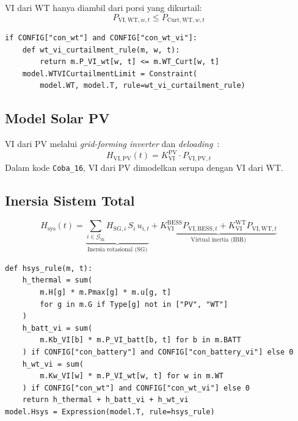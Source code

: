 \documentclass[journal]{IEEEtran}
\newcommand{\Hsys}{H_{\mathrm{sys}}}
\newcommand{\HVIPV}{H_{\mathrm{VI,PV}}}
\begin{document}
VI dari WT hanya diambil dari porsi yang dikurtail:
\begin{equation}
  P_{\mathrm{VI,WT},w,t} \leq P_{\mathrm{Curt,WT},w,t}
  \label{eq:wt_vi_curtailment}
\end{equation}

\begin{lstlisting}[style=pycode,caption={Constraint VI WT dari curtailment (Cell 55)}]
if CONFIG["con_wt"] and CONFIG["con_wt_vi"]:
    def wt_vi_curtailment_rule(m, w, t):
        return m.P_VI_wt[w, t] <= m.WT_Curt[w, t]
    model.WTVICurtailmentLimit = Constraint(
        model.WT, model.T, rule=wt_vi_curtailment_rule)
\end{lstlisting}

\subsection{Model Solar PV}

VI dari PV melalui \textit{grid-forming inverter} dan
\textit{deloading}~\cite{Asiedu2025}:
\begin{equation}
  \HVIPV(t) = K_{\mathrm{VI}}^{\mathrm{PV}} \cdot P_{\mathrm{VI,PV},t}
  \label{eq:h_pv_vi}
\end{equation}
Dalam kode \texttt{Coba\_16}, VI dari PV dimodelkan
serupa dengan VI dari WT.

\subsection{Inersia Sistem Total}

\begin{equation}
  \Hsys(t) =
    \underbrace{\sum_{i \in \mathcal{G}_{\mathrm{th}}}
      H_{\mathrm{SG},i}\,S_i\,u_{i,t}}_{\text{Inersia rotasional (SG)}}
    +
    \underbrace{K_{\mathrm{VI}}^{\mathrm{BESS}} P_{\mathrm{VI,BESS},t}
    + K_{\mathrm{VI}}^{\mathrm{WT}} P_{\mathrm{VI,WT},t}}_{\text{Virtual inertia (IBR)}}
  \label{eq:hsys}
\end{equation}

\begin{lstlisting}[style=pycode,caption={Ekspresi Hsys di Pyomo (Cell 22)}]
def hsys_rule(m, t):
    h_thermal = sum(
        m.H[g] * m.Pmax[g] * m.u[g, t]
        for g in m.G if Type[g] not in ["PV", "WT"]
    )
    h_batt_vi = sum(
        m.Kb_VI[b] * m.P_VI_batt[b, t] for b in m.BATT
    ) if CONFIG["con_battery"] and CONFIG["con_battery_vi"] else 0
    h_wt_vi = sum(
        m.Kw_VI[w] * m.P_VI_wt[w, t] for w in m.WT
    ) if CONFIG["con_wt"] and CONFIG["con_wt_vi"] else 0
    return h_thermal + h_batt_vi + h_wt_vi
model.Hsys = Expression(model.T, rule=hsys_rule)
\end{lstlisting}
\end{document}
